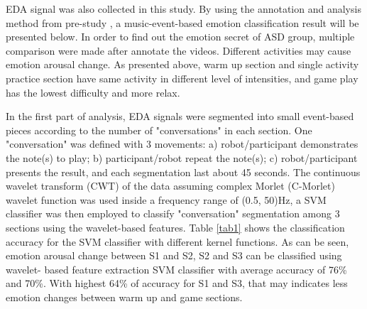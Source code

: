 EDA signal was also collected in this study. By using the annotation and analysis method from 
pre-study \cite{feng2018wavelet}, a music-event-based emotion classification result will 
be presented below. In order to find out the emotion secret of ASD group, multiple comparison
were made after annotate the videos. Different activities may cause emotion arousal change. 
As presented above, warm up section and single activity practice section have same activity in 
different level of intensities, and game play has the lowest difficulty and more relax. 

In the first part of analysis, EDA signals were segmented into small event-based pieces according to 
the number of "conversations" in each section. One "conversation" was defined with 3 movements:
a) robot/participant demonstrates the note(s) to play; b) participant/robot repeat the note(s); 
c) robot/participant presents the result, and each segmentation last about 45 seconds. The 
continuous wavelet transform (CWT) of the data assuming complex Morlet (C-Morlet) wavelet function
was used inside a frequency range of (0.5, 50)Hz, a SVM classifier was then employed to classify
"conversation" segmentation among 3 sections using the wavelet-based features. Table \ref{tab1}
shows the classification accuracy for the SVM classifier with different kernel functions. 
As can be seen, emotion arousal change between S1 and S2, S2 and S3 can be classified using wavelet-
based feature extraction SVM classifier with average accuracy of 76\% and 70\%. With highest 64\% of accuracy
for S1 and S3, that may indicates less emotion changes between warm up and game sections. \\


